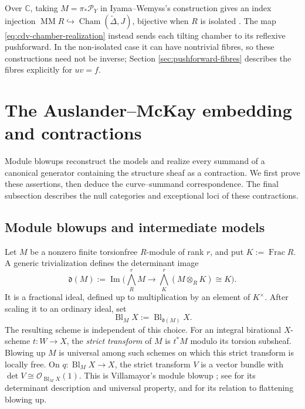 \documentclass[a4paper,reqno]{amsart}
\def\O{\mathcal{O}}
\def\P{\mathcal{P}}
\DeclareMathOperator{\Frac}{Frac}
\DeclareMathOperator{\im}{Im}
\DeclareMathOperator{\MM}{MM}
\theoremstyle{definition}
\begin{document}
Over $\mathbb C$, taking $M=\pi_*\P_Y$ in Iyama--Wemyss's construction gives an index injection $\MM R\hookrightarrow\operatorname{Cham}(\widetilde\Delta,J)$, bijective when $R$ is isolated \cite[Theorem 0.13 and Corollary 9.8]{IWTC}. The map \eqref{eq:cdv-chamber-realization} instead sends each tilting chamber to its reflexive pushforward. In the non-isolated case it can have nontrivial fibres, so these constructions need not be inverse; Section \ref{sec:pushforward-fibres} describes the fibres explicitly for $uv=f$.

\section{The Auslander--McKay embedding and contractions}\label{sec:general-auslander-mckay}

Module blowups reconstruct the models and realize every summand of a canonical generator containing the structure sheaf as a contraction. We first prove these assertions, then deduce the curve--summand correspondence. The final subsection describes the null categories and exceptional loci of these contractions.

\subsection{Module blowups and intermediate models}

Let $M$ be a nonzero finite torsionfree $R$-module of rank $r$, and put $K:=\Frac R$. A generic trivialization defines the determinant image
\begin{equation}\label{eq:module-determinant-ideal}
\mathfrak d(M):=\im\bigl(\textstyle\bigwedge_R^rM
\longrightarrow\bigwedge_K^r(M\otimes_RK)\cong K\bigr).
\end{equation}
It is a fractional ideal, defined up to multiplication by an element of $K^\times$. After scaling it to an ordinary ideal, set
\[
\operatorname{Bl}_M X:=\operatorname{Bl}_{\mathfrak d(M)}X.
\]
The resulting scheme is independent of this choice. For an integral birational $X$-scheme $t\colon W\to X$, the \emph{strict transform} of $M$ is $t^*M$ modulo its torsion subsheaf. Blowing up $M$ is universal among such schemes on which this strict transform is locally free. On $q\colon\operatorname{Bl}_M X\to X$, the strict transform $V$ is a vector bundle with $\det V\cong\O_{\operatorname{Bl}_M X}(1)$. This is Villamayor's module blowup \cite{Vil06}; see \cite[Theorem 2.10]{BCZ12} for its determinant description and universal property, and \cite[Section 2.2]{GI18} for its relation to flattening blowing up.
\end{document}
